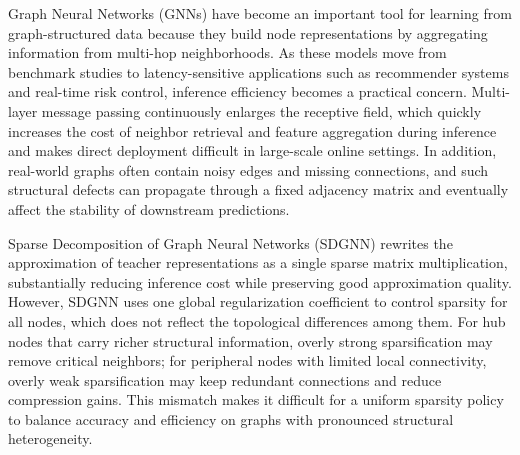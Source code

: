 \begin{abstract}
本文从图结构统计量出发，构建面向节点差异的稀疏分配方式，降低稀疏推理对全局统一预算的依赖。在保持线性推理复杂度的前提下，该方法提升了不同拓扑角色节点的适配性，也为大规模图上的高效推理提供了较为直接的实现路径。

\end{abstract}

\begin{abstract*}

Graph Neural Networks (GNNs) have become an important tool for learning from graph-structured data because they build node representations by aggregating information from multi-hop neighborhoods. As these models move from benchmark studies to latency-sensitive applications such as recommender systems and real-time risk control, inference efficiency becomes a practical concern. Multi-layer message passing continuously enlarges the receptive field, which quickly increases the cost of neighbor retrieval and feature aggregation during inference and makes direct deployment difficult in large-scale online settings. In addition, real-world graphs often contain noisy edges and missing connections, and such structural defects can propagate through a fixed adjacency matrix and eventually affect the stability of downstream predictions.

Sparse Decomposition of Graph Neural Networks (SDGNN) rewrites the approximation of teacher representations as a single sparse matrix multiplication, substantially reducing inference cost while preserving good approximation quality. However, SDGNN uses one global regularization coefficient to control sparsity for all nodes, which does not reflect the topological differences among them. For hub nodes that carry richer structural information, overly strong sparsification may remove critical neighbors; for peripheral nodes with limited local connectivity, overly weak sparsification may keep redundant connections and reduce compression gains. This mismatch makes it difficult for a uniform sparsity policy to balance accuracy and efficiency on graphs with pronounced structural heterogeneity.


\end{abstract*}
